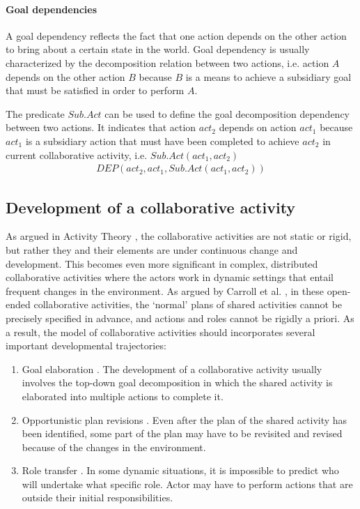 \paragraph*{Goal dependencies} %
\label{par:goal_dependencies}
A goal dependency reflects the fact that one action depends on the other action to bring about a certain state in the world. Goal dependency is usually characterized by the decomposition relation between two actions, i.e. action $A$ depends on the other action $B$ because $B$ is a means to achieve a subsidiary goal that must be satisfied in order to perform $A$.

The predicate $Sub.Act$ can be used to define the goal decomposition dependency between two actions. It indicates that action $act_2$ depends on action $act_1$ because $act_1$ is a subsidiary action that must have been completed to achieve $act_2$ in current collaborative activity, i.e. $Sub.Act(act_1, act_2)$
\begin{align*} 
	 DEP(act_2, act_1, Sub.Act(act_1, act_2))
\end{align*}

\subsection{Development of a collaborative activity} %
\label{sub:development_of_a_collaborative_activity}
As argued in Activity Theory \cite{nardi1996context}, the collaborative activities are not static or rigid, but rather they and their elements are under continuous change and development. This becomes even more significant in complex, distributed collaborative activities where the actors work in dynamic settings that entail frequent changes in the environment. As argued by Carroll et al. \cite{carroll2006a}, in these open-ended collaborative activities, the `normal' plans of shared activities cannot be precisely specified in advance, and actions and roles cannot be rigidly a priori. As a result, the model of collaborative activities should incorporates several important developmental trajectories:

\begin{enumerate}
 	\item Goal elaboration \cite{Grosz2006}. The development of a collaborative activity usually involves the top-down goal decomposition in which the shared activity is elaborated into multiple actions to complete it. 
 	\item Opportunistic plan revisions \cite{suchman1987plans}. Even after the plan of the shared activity has been identified, some part of the plan may have to be revisited and revised because of the changes in the environment.
 	\item Role transfer \cite{Turoff2004}. In some dynamic situations, it is impossible to predict who will undertake what specific role. Actor may have to perform actions that are outside their initial responsibilities.
 \end{enumerate} 

